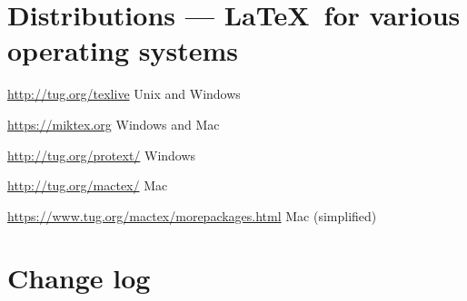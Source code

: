 \documentclass{article}
\def\LaTeX{LaTeX}%
\def\Dash{ --- }%
\renewcommand*{\LaTeX}{LaTeX}
\renewcommand*{\Dash}{ --- }
\begin{document}
\section{Distributions \Dash \LaTeX\ for various operating systems}
\begin{description}[style=unboxed]
\item[TeXLive:] \url{http://tug.org/texlive} \hfill Unix and Windows
\item[MiKTex:] \url{https://miktex.org}  \hfill Windows and Mac
\item[proTeXt:] \url{http://tug.org/protext/}  \hfill Windows
\item[MacTeX:] \url{http://tug.org/mactex/} \hfill Mac
\item[BasicTeX:] \url{https://www.tug.org/mactex/morepackages.html} \hfill Mac (simplified)
\end{description}



\section{Change log}
\end{document}
